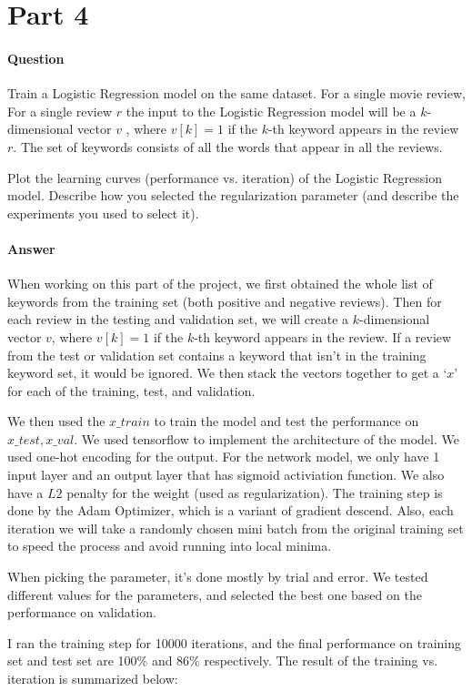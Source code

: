 \documentclass[11pt,twoside]{article}
\begin{document}
\section*{Part 4}
\paragraph{Question}
Train a Logistic Regression model on the same dataset. For a single movie review, For a single review $r$ the input to the Logistic Regression model will be a $k$-dimensional vector $v$ , where $v[k]=1$ if the $k$-th keyword appears in the review $r$. The set of keywords consists of all the words that appear in all the reviews.

Plot the learning curves (performance vs. iteration) of the Logistic Regression model. Describe how you selected the regularization parameter (and describe the experiments you used to select it).

\paragraph{Answer}
When working on this part of the project, we first obtained the whole list of keywords from the training set (both positive and negative reviews). Then for each review in the testing and validation set, we will create a $k$-dimensional vector $v$, where $v[k]=1$ if the $k$-th keyword appears in the review. If a review from the test or validation set contains a keyword that isn't in the training keyword set, it would be ignored. We then stack the vectors together to get a `$x$' for each of the training, test, and validation. 

We then used the $x\_train$ to train the model and test the performance on $x\_test, x\_val$. We used tensorflow to implement the architecture of the model. We used one-hot encoding for the output. For the network model, we only have 1 input layer and an output layer that has sigmoid activiation function. We also have a $L2$ penalty for the weight (used as regularization). The training step is done by the Adam Optimizer, which is a variant of gradient descend. Also, each iteration we will take a randomly chosen mini batch from the original training set to speed the process and avoid running into local minima.

When picking the parameter, it's done mostly by trial and error. We tested different values for the parameters, and selected the best one based on the performance on validation.

I ran the training step for 10000 iterations, and the final performance on training set and test set are 100\% and 86\% respectively. The result of the training vs. iteration is summarized below:
\end{document}
